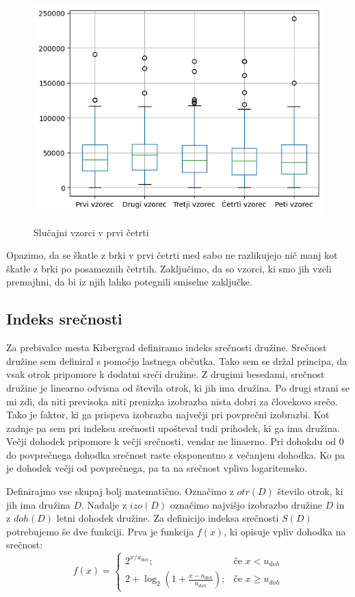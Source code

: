 \documentclass{article}
\begin{document}
\begin{figure}[H]
    \caption{Slučajni vzorci v prvi četrti}
    \centering
    \includegraphics[scale=0.8]{vzorci_severne_cetrti.png}
    \label{fig:slika2}
\end{figure}

Opazimo, da se škatle z brki v prvi četrti med sabo ne razlikujejo nič manj kot škatle z brki po posameznih četrtih. Zaključimo, da so vzorci, ki 
smo jih vzeli premajhni, da bi iz njih lahko potegnili smiselne zaključke. 



\subsection{Indeks srečnosti}

Za prebivalce mesta Kibergrad definiramo indeks srečnosti družine. Srečnost družine sem definiral s pomočjo lastnega občutka. Tako sem se držal principa, da 
vsak otrok pripomore k dodatni sreči družine. Z drugimi besedami, srečnost družine je linearno odvisna od števila otrok, ki jih ima družina. Po drugi strani se mi zdi, da niti previsoka 
niti prenizka izobrazba nista dobri za človekovo srečo. Tako je faktor, ki ga prispeva izobrazba največji pri povprečni izobrazbi. Kot zadnje pa sem pri indeksu srečnosti upošteval tudi 
prihodek, ki ga ima družina. Večji dohodek pripomore k večji srečnosti, vendar ne linaerno. Pri dohokdu od 0 do povprečnega dohodka srečnost raste eksponentno z večanjem dohodka. Ko pa je dohodek 
večji od povprečnega, pa ta na srečnost vpliva logaritemsko. 

Definirajmo vse skupaj bolj matematično. Označimo z $otr(D)$ število otrok, ki jih ima družina $D$. Nadalje z $izo(D)$ označimo najvišjo izobrazbo družine $D$ in z $doh(D)$ letni 
dohodek družine. Za definicijo indeksa srečnosti $S(D)$ potrebujemo še dve funkciji. Prva je funkcija $f(x)$, ki opisuje vpliv dohodka na srečnost:
$$
f(x) =
\begin{cases}
    2^{x/u_{doh}}; & \text{če } x < u_{doh} \\
    2 + \log_2 (1 + \frac{x - u_{doh}}{u_{doh}}); & \text{če } x \geq u_{doh}
\end{cases}
$$ 
\end{document}
